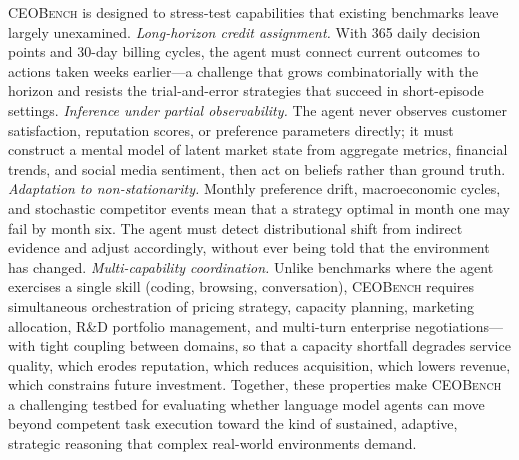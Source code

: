 \textsc{CEOBench} is designed to stress-test capabilities that existing benchmarks leave largely unexamined.
%
\emph{Long-horizon credit assignment.}
With 365 daily decision points and 30-day billing cycles, the agent must connect current outcomes to actions taken weeks earlier---a challenge that grows combinatorially with the horizon and resists the trial-and-error strategies that succeed in short-episode settings.
%
\emph{Inference under partial observability.}
The agent never observes customer satisfaction, reputation scores, or preference parameters directly; it must construct a mental model of latent market state from aggregate metrics, financial trends, and social media sentiment, then act on beliefs rather than ground truth.
%
\emph{Adaptation to non-stationarity.}
Monthly preference drift, macroeconomic cycles, and stochastic competitor events mean that a strategy optimal in month one may fail by month six.
The agent must detect distributional shift from indirect evidence and adjust accordingly, without ever being told that the environment has changed.
%
\emph{Multi-capability coordination.}
Unlike benchmarks where the agent exercises a single skill (coding, browsing, conversation), \textsc{CEOBench} requires simultaneous orchestration of pricing strategy, capacity planning, marketing allocation, R\&D portfolio management, and multi-turn enterprise negotiations---with tight coupling between domains, so that a capacity shortfall degrades service quality, which erodes reputation, which reduces acquisition, which lowers revenue, which constrains future investment.
%
Together, these properties make \textsc{CEOBench} a challenging testbed for evaluating whether language model agents can move beyond competent task execution toward the kind of sustained, adaptive, strategic reasoning that complex real-world environments demand.
